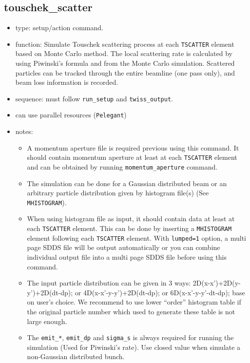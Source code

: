 \documentclass[11pt]{article}
\begin{document}
\subsection{touschek\_scatter \label{subsec:touschekscatter}}
\begin{itemize}
\item type: setup/action command.
\item function: Simulate Touschek scattering process at each \verb|TSCATTER| element 
   based on Monte Carlo method. The local scattering rate is
   calculated by using Piwinski's formula and from the Monte Carlo
   simulation. Scattered particles can be tracked through the entire
   beamline (one pass only), and beam loss information is recorded.
\item sequence: must follow \verb|run_setup| and \verb|twiss_output|.
\item can use parallel resources (\verb|Pelegant|)
\item notes: 
	\begin{itemize} 
      \item A momentum aperture file is required previous using this command. It
      should contain momentum aperture at least at each \verb|TSCATTER| element and can be
      obtained by running \verb|momentum_aperture| command. 
      \item The simulation can be done for a Gaussian distributed beam or an arbitrary 
      particle distribution given by histogram file(s) (See \verb|MHISTOGRAM|).  
      \item When using histogram file as input, it should contain data at least at each 
      \verb|TSCATTER| element. This can be done by inserting a \verb|MHISTOGRAM| element 
      following each \verb|TSCATTER| element. With \verb|lumped=1| option, a multi page 
      SDDS file will be output automatically or you can combine individual output file 
      into a multi page SDDS file before using this command.
      \item The input particle distribution can be given in 3 ways: 2D(x-x')+2D(y-y')+2D(dt-dp);
      or 4D(x-x'-y-y')+2D(dt-dp); or 6D(x-x'-y-y'-dt-dp); base on user's choice. We recommend
      to use lower ``order'' histogram table if the original particle number which used to generate
      these table is not large enough.
      \item The \verb|emit_*|, \verb|emit_dp| and \verb|sigma_s| is always required for running
      the simulation (Used for Piwinski's rate). Use closed value when simulate a non-Gaussian 
      distributed bunch. 
	\end{itemize}
\end{itemize}
\end{document}
